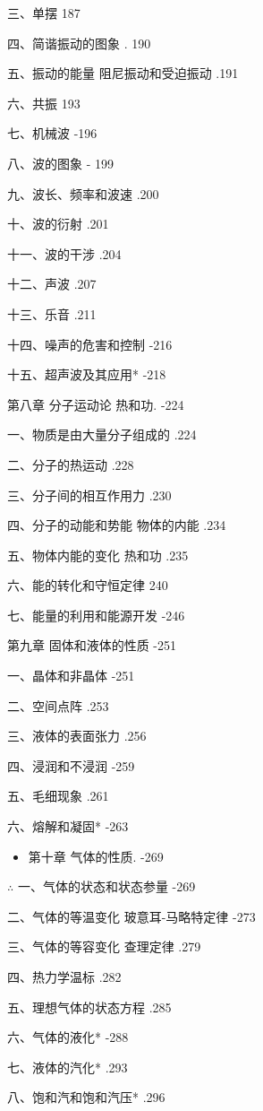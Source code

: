 \documentclass[10pt]{article}
\begin{document}
三、单摆 187

四、简谐振动的图象 . 190

五、振动的能量 阻尼振动和受迫振动 .191

六、共振 193

七、机械波 -196

八、波的图象 - 199

九、波长、频率和波速 .200

十、波的衍射 .201

十一、波的干涉 .204

十二、声波 .207

十三、乐音 .211

十四、噪声的危害和控制 -216

十五、超声波及其应用* -218

第八章 分子运动论 热和功. -224

一、物质是由大量分子组成的 .224

二、分子的热运动 .228

三、分子间的相互作用力 .230

四、分子的动能和势能 物体的内能 .234

五、物体内能的变化 热和功 .235

六、能的转化和守恒定律 240

七、能量的利用和能源开发 -246

第九章 固体和液体的性质 -251

一、晶体和非晶体 -251

二、空间点阵 .253

三、液体的表面张力 .256

四、浸润和不浸润 -259

五、毛细现象 .261

六、熔解和凝固* -263

\begin{itemize}
\item 第十章 气体的性质. -269
\end{itemize}

\(\therefore\) 一、气体的状态和状态参量 -269

二、气体的等温变化 玻意耳-马略特定律 -273

三、气体的等容变化 查理定律 .279

四、热力学温标 .282

五、理想气体的状态方程 .285

六、气体的液化* -288

七、液体的汽化* .293

八、饱和汽和饱和汽压* .296
\end{document}
